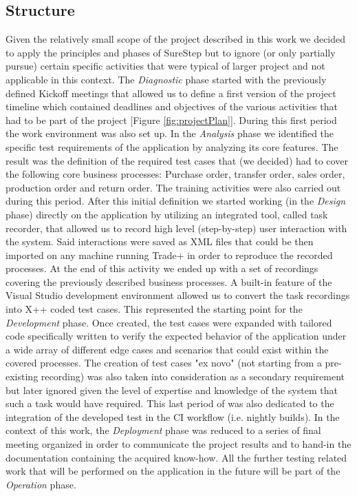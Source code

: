 \subsection{Structure}

Given the relatively small scope of the project described in this work we decided to apply the principles and phases of SureStep but to ignore (or only partially pursue) certain specific activities that were typical of larger project and not applicable in this context. 
The \textit{Diagnostic} phase started with the previously defined Kickoff meetings that allowed us to define a first version of the project timeline which contained deadlines and objectives of the various activities that had to be part of the project [Figure \ref{fig:projectPlan}].  During this first period the work environment was also set up. 
In the \textit{Analysis} phase we identified the specific test requirements of the application by analyzing its core features. The result was the definition of the required test cases that (we decided) had to cover the following core business processes: Purchase order, transfer order, sales order, production order and return order. The training activities were also carried out during this period. 
After this initial definition we started working (in the \textit{Design} phase) directly on the application by utilizing an integrated tool, called task recorder, that allowed us to record high level (step-by-step) user interaction with the system. Said interactions were saved as XML files that could be then imported on any machine running Trade+ in order to reproduce the recorded processes. At the end of this activity we ended up with a set of recordings covering the previously described business processes. 
A built-in feature of the Visual Studio development environment allowed us to convert the task recordings into X++ coded test cases. This represented the starting point for the \textit{Development} phase. Once created, the test cases were expanded with tailored code specifically written to verify the expected behavior of the application under a wide array of different edge cases and scenarios that could exist within the covered processes. The creation of test cases "ex novo" (not starting from a pre-existing recording) was also taken into consideration as a secondary requirement but later ignored given the level of expertise and knowledge of the system that such a task would have required. This last period of was also dedicated to the integration of the developed test in the CI workflow (i.e. nightly builds). 
In the context of this work, the \textit{Deployment} phase was reduced to a series of final meeting organized in order to communicate the project results and to hand-in the documentation containing the acquired know-how. 
All the further testing related work that will be performed on the application in the future will be part of the \textit{Operation} phase.

